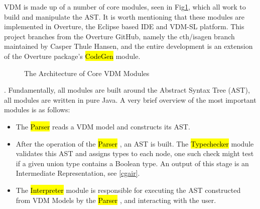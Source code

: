 VDM is made up of a number of core modules, seen in Fig\ref{fig:VDM Modules Architecture}, which all work to build and manipulate the AST. It is worth mentioning that these modules are implemented in Overture, the Eclipse based IDE and VDM-SL platform. This project branches from the Overture GitHub, namely the cth/isagen branch maintained by Casper Thule Hansen,\parencite{VDM2ISAGit} and the entire development is an extension of the Overture package's \ttfamily\hl{CodeGen} module.\rmfamily\begin{figure}
        \caption{\label{fig:VDM Modules Architecture} The Architecture of Core VDM Modules \parencite{OvertureWikiArchitectureDescription}}
      \end{figure}.
Fundamentally, all modules are built around the Abstract Syntax Tree (AST), all modules are written in pure Java. A very brief overview of the most important modules is as follows: \begin{itemize}
	\item The \ttfamily\hl{Parser} \rmfamily reads a VDM model and constructs its AST.
	\item After the operation of the \ttfamily\hl{Parser} \rmfamily, an AST is built. The \ttfamily\hl{Typechecker} \rmfamily module validates this AST and assigns types to each node, one such check might test if a given union type contains a Boolean type. An output of this stage is an Intermediate Representation, see \ref{cgair}.
	\item The \ttfamily\hl{Interpreter} \rmfamily module is responsible for executing the AST constructed from VDM Models by the \ttfamily\hl{Parser} \rmfamily, and interacting with the user.
	\end{itemize}


